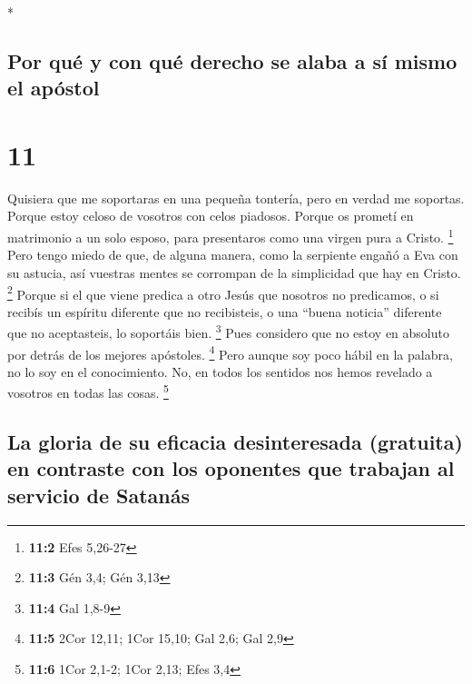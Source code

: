 \begin{paracol}{2}
\begin{otherlanguage}{english}
\end{otherlanguage}

\switchcolumn[0]*

\hypertarget{por-quuxe9-y-con-quuxe9-derecho-se-alaba-a-suxed-mismo-el-apuxf3stol}{%
\subsection{Por qué y con qué derecho se alaba a sí mismo el
apóstol}\label{por-quuxe9-y-con-quuxe9-derecho-se-alaba-a-suxed-mismo-el-apuxf3stol}}

\hypertarget{section-20}{%
\section{11}\label{section-20}}

 Quisiera que me soportaras en una pequeña tontería, pero
en verdad me soportas.  Porque estoy celoso de vosotros
con celos piadosos. Porque os prometí en matrimonio a un solo esposo,
para presentaros como una virgen pura a Cristo. \footnote{\textbf{11:2}
  Efes 5,26-27}  Pero tengo miedo de que, de alguna
manera, como la serpiente engañó a Eva con su astucia, así vuestras
mentes se corrompan de la simplicidad que hay en Cristo. \footnote{\textbf{11:3}
  Gén 3,4; Gén 3,13}  Porque si el que viene predica a
otro Jesús que nosotros no predicamos, o si recibís un espíritu
diferente que no recibisteis, o una ``buena noticia'' diferente que no
aceptasteis, lo soportáis bien. \footnote{\textbf{11:4} Gal 1,8-9}
 Pues considero que no estoy en absoluto por detrás de los
mejores apóstoles. \footnote{\textbf{11:5} 2Cor 12,11; 1Cor 15,10; Gal
  2,6; Gal 2,9}  Pero aunque soy poco hábil en la palabra,
no lo soy en el conocimiento. No, en todos los sentidos nos hemos
revelado a vosotros en todas las cosas. \footnote{\textbf{11:6} 1Cor
  2,1-2; 1Cor 2,13; Efes 3,4}

\hypertarget{la-gloria-de-su-eficacia-desinteresada-gratuita-en-contraste-con-los-oponentes-que-trabajan-al-servicio-de-satanuxe1s}{%
\subsection{La gloria de su eficacia desinteresada (gratuita) en
contraste con los oponentes que trabajan al servicio de
Satanás}\label{la-gloria-de-su-eficacia-desinteresada-gratuita-en-contraste-con-los-oponentes-que-trabajan-al-servicio-de-satanuxe1s}}


\end{paracol}
